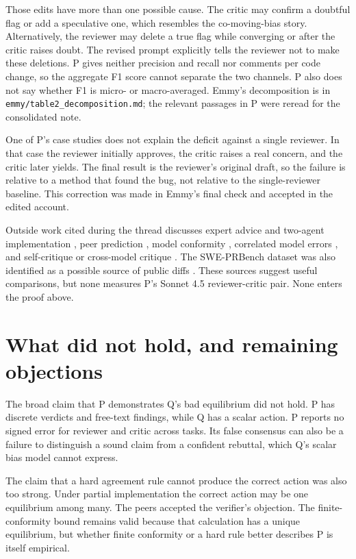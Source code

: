\documentclass{article}
\begin{document}
Those edits have more than one possible cause. The critic may confirm a doubtful flag or add a speculative one, which resembles the co-moving-bias story. Alternatively, the reviewer may delete a true flag while converging or after the critic raises doubt. The revised prompt explicitly tells the reviewer not to make these deletions. P gives neither precision and recall nor comments per code change, so the aggregate F1 score cannot separate the two channels. P also does not say whether F1 is micro- or macro-averaged. Emmy's decomposition is in \texttt{emmy/table2\_decomposition.md}; the relevant passages in P were reread for the consolidated note.

One of P's case studies does not explain the deficit against a single reviewer. In that case the reviewer initially approves, the critic raises a real concern, and the critic later yields. The final result is the reviewer's original draft, so the failure is relative to a method that found the bug, not relative to the single-reviewer baseline. This correction was made in Emmy's final check and accepted in the edited account.

Outside work cited during the thread discusses expert advice and two-agent implementation \cite{krishnaMorgan,duttaSen,mooreRepullo}, peer prediction \cite{peerPredictionSurvey}, model conformity \cite{conformity1,conformity2}, correlated model errors \cite{correlatedProviders,correlatedErrors}, and self-critique or cross-model critique \cite{selfCorrection,deltaBench,codeSelfRepair}. The SWE-PRBench dataset was also identified as a possible source of public diffs \cite{sweprbench}. These sources suggest useful comparisons, but none measures P's Sonnet 4.5 reviewer-critic pair. None enters the proof above.

\section{What did not hold, and remaining objections}

The broad claim that P demonstrates Q's bad equilibrium did not hold. P has discrete verdicts and free-text findings, while Q has a scalar action. P reports no signed error for reviewer and critic across tasks. Its false consensus can also be a failure to distinguish a sound claim from a confident rebuttal, which Q's scalar bias model cannot express.

The claim that a hard agreement rule cannot produce the correct action was also too strong. Under partial implementation the correct action may be one equilibrium among many. The peers accepted the verifier's objection. The finite-conformity bound remains valid because that calculation has a unique equilibrium, but whether finite conformity or a hard rule better describes P is itself empirical.
\end{document}
